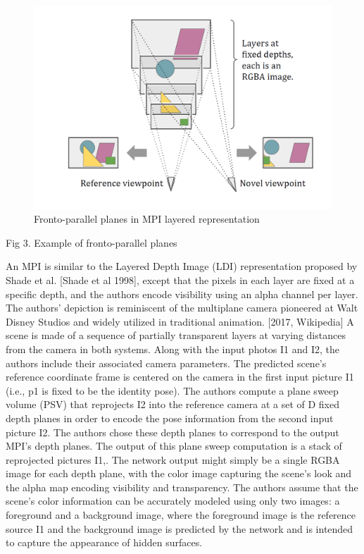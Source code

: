 \begin{figure}[!h]
    \includegraphics[width=1\columnwidth]{figures/mpi-layered-representation.png}
    \caption{Fronto-parallel planes in MPI layered representation}
    \label{fig:mpi-layered-representation}
\end{figure}
Fig 3. Example of fronto-parallel planes

An MPI is similar to the Layered Depth Image (LDI) representation proposed by Shade et al. [Shade et al 1998], except that the pixels in each layer are fixed at a specific depth, and the authors encode visibility using an alpha channel per layer. The authors' depiction is reminiscent of the multiplane camera pioneered at Walt Disney Studios and widely utilized in traditional animation. [2017, Wikipedia] A scene is made of a sequence of partially transparent layers at varying distances from the camera in both systems. Along with the input photos I1 and I2, the authors include their associated camera parameters. The predicted scene's reference coordinate frame is centered on the camera in the first input picture I1 (i.e., p1 is fixed to be the identity pose). The authors compute a plane sweep volume (PSV) that reprojects I2 into the reference camera at a set of D fixed depth planes in order to encode the pose information from the second input picture I2. The authors chose these depth planes to correspond to the output MPI's depth planes. The output of this plane sweep computation is a stack of reprojected pictures I1,. The network output might simply be a single RGBA image for each depth plane, with the color image capturing the scene's look and the alpha map encoding visibility and transparency. The authors assume that the scene's color information can be accurately modeled using only two images: a foreground and a background image, where the foreground image is the reference source I1 and the background image is predicted by the network and is intended to capture the appearance of hidden surfaces.

